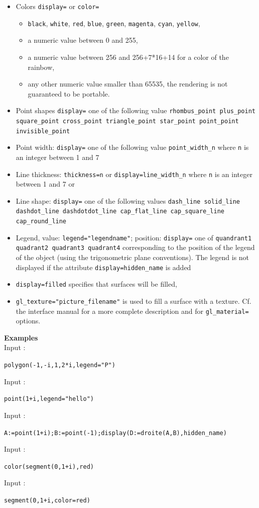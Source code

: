 \documentclass[a4paper,11pt]{book}
\begin{document}
\begin{itemize}
\item Colors {\tt display=} or {\tt color=}
\begin{itemize}
\item {\tt black}, {\tt white}, {\tt red}, {\tt blue}, {\tt green}, 
{\tt magenta}, {\tt cyan}, {\tt yellow},
\item a numeric value between 0 and 255,
\item a numeric value between 256 and 256+7*16+14 for a color of the
rainbow,
\item any other numeric value smaller than 65535, the rendering
is not guaranteed to be portable.
\end{itemize}
\item Point shapes {\tt display=} one of the following value
{\tt rhombus\_point plus\_point  square\_point cross\_point 
triangle\_point star\_point point\_point invisible\_point}
\item Point width: {\tt display=} one of the following value
{\tt point\_width\_n} where {\tt n} is an
integer between 1 and 7
\item Line thickness: {\tt thickness=n}
or {\tt display=line\_width\_n} where {\tt n} is an
integer between 1 and 7 or 
\item Line shape: {\tt display=} one of the following values
{\tt dash\_line solid\_line dashdot\_line dashdotdot\_line
  cap\_flat\_line cap\_square\_line cap\_round\_line }
\item Legend, value: {\tt legend="legendname"};
 position: {\tt display=} one of
{\tt quandrant1 quadrant2 quadrant3 quadrant4}
corresponding to the position of the legend of the object 
(using the trigonometric plane conventions).
The legend is not displayed if the attribute 
{\tt display=hidden\_name} is added
\item {\tt display=filled} specifies that surfaces will be filled,
\item {\tt gl\_texture="picture\_filename"} is used to fill 
a surface with a texture.  
Cf. the interface manual for a more complete
description and for {\tt gl\_material=} options.
\end{itemize}
{\bf Examples}\\
Input :
\begin{center}{\tt polygon(-1,-i,1,2*i,legend="P")}\end{center}
Input :
\begin{center}{\tt point(1+i,legend="hello")}\end{center}
Input :
\begin{center}{\tt A:=point(1+i);B:=point(-1);display(D:=droite(A,B),hidden\_name)}\end{center}
Input :
\begin{center}{\tt color(segment(0,1+i),red)}\end{center}
Input :
\begin{center}{\tt segment(0,1+i,color=red)}\end{center}
\end{document}
